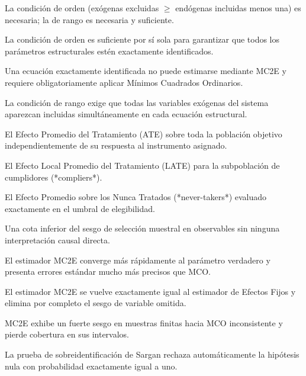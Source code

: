 \begin{opts}
    \item La condición de orden (exógenas excluidas $\ge$ endógenas incluidas menos una) es necesaria; la de rango es necesaria y suficiente.
    \item La condición de orden es suficiente por sí sola para garantizar que todos los parámetros estructurales estén exactamente identificados.
    \item Una ecuación exactamente identificada no puede estimarse mediante MC2E y requiere obligatoriamente aplicar Mínimos Cuadrados Ordinarios.
    \item La condición de rango exige que todas las variables exógenas del sistema aparezcan incluidas simultáneamente en cada ecuación estructural.
\end{opts}

\begin{opts}
    \item El Efecto Promedio del Tratamiento (ATE) sobre toda la población objetivo independientemente de su respuesta al instrumento asignado.
    \item El Efecto Local Promedio del Tratamiento (LATE) para la subpoblación de cumplidores (*compliers*).
    \item El Efecto Promedio sobre los Nunca Tratados (*never-takers*) evaluado exactamente en el umbral de elegibilidad.
    \item Una cota inferior del sesgo de selección muestral en observables sin ninguna interpretación causal directa.
\end{opts}

\begin{opts}
    \item El estimador MC2E converge más rápidamente al parámetro verdadero y presenta errores estándar mucho más precisos que MCO.
    \item El estimador MC2E se vuelve exactamente igual al estimador de Efectos Fijos y elimina por completo el sesgo de variable omitida.
    \item MC2E exhibe un fuerte sesgo en muestras finitas hacia MCO inconsistente y pierde cobertura en sus intervalos.
    \item La prueba de sobreidentificación de Sargan rechaza automáticamente la hipótesis nula con probabilidad exactamente igual a uno.
\end{opts}

